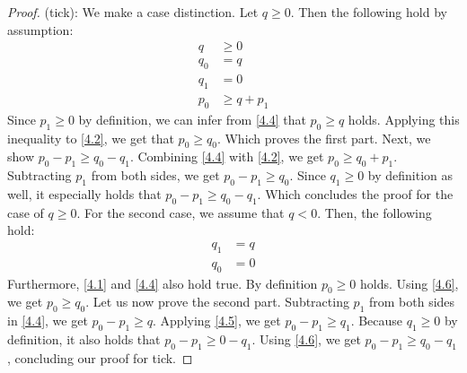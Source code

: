 \begin{proof}
   (tick): We make a case distinction. Let \(q \geq 0\). Then the following hold by assumption:
   \begin{align}
      q     &\geq 0 \label{4.1}\\
      q_0   &= q \label{4.2}\\
      q_1   &= 0 \label{4.3}\\
      p_0   &\geq q + p_1 \label{4.4}
   \end{align}
   Since \(p_1 \geq 0\) by definition, we can infer from \ref{4.4} that \(p_0 \geq q\) holds. Applying this inequality to \ref{4.2}, we get that \(p_0 \geq q_0\). Which proves the first part.
   Next, we show \(p_0 - p_1 \geq q_0 - q_1\). Combining \ref{4.4} with \ref{4.2}, we get \(p_0 \geq q_0 + p_1\). Subtracting \(p_1\) from both sides, we get \(p_0 - p_1 \geq q_0\). Since \(q_1 \geq 0\) by definition as well, it especially holds that \(p_0 - p_1 \geq q_0 - q_1\). Which concludes the proof for the case of \(q \geq 0\).
   For the second case, we assume that \(q < 0\). Then, the following hold:
   \begin{align}
      q_1   &= q \label{4.5}\\
      q_0   &= 0 \label{4.6}
   \end{align}
   Furthermore, \ref{4.1} and \ref{4.4} also hold true. By definition \(p_0 \geq 0\) holds. Using \ref{4.6}, we get \(p_0 \geq q_0\). 
   Let us now prove the second part. Subtracting \(p_1\) from both sides in \ref{4.4}, we get \(p_0 - p_1 \geq q \). Applying \cref{4.5}, we get \(p_0 - p_1 \geq q_1\). Because \(q_1 \geq 0\) by definition, it also holds that \(p_0 - p_1 \geq 0 - q_1\). Using \ref{4.6}, we get \(p_0 - p_1 \geq q_0 - q_1\), concluding our proof for tick.
      

\end{proof}
